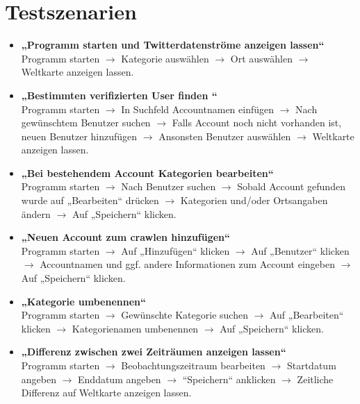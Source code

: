 \section{Testszenarien}
\begin{itemize}
	\item \textbf{„Programm starten und Twitterdatenströme anzeigen lassen“}\\
Programm starten $\rightarrow$ Kategorie auswählen $\rightarrow$ Ort auswählen $\rightarrow$ Weltkarte anzeigen lassen.

	\item \textbf{„Bestimmten verifizierten User finden “}\\
Programm starten $\rightarrow$ In Suchfeld Accountnamen einfügen $\rightarrow$ Nach gewünschtem Benutzer suchen $\rightarrow$ Falls Account noch nicht vorhanden ist, neuen Benutzer hinzufügen $\rightarrow$ Ansonsten Benutzer auswählen $\rightarrow$ Weltkarte anzeigen lassen.

	\item \textbf{„Bei bestehendem Account Kategorien bearbeiten“}\\
Programm starten $\rightarrow$ Nach Benutzer suchen $\rightarrow$ Sobald Account gefunden wurde auf „Bearbeiten“ drücken $\rightarrow$ Kategorien und/oder Ortsangaben ändern $\rightarrow$ Auf „Speichern“ klicken.

	\item \textbf{„Neuen Account zum crawlen hinzufügen“}\\
Programm starten $\rightarrow$ Auf „Hinzufügen“ klicken $\rightarrow$ Auf „Benutzer“ klicken $\rightarrow$ Accountnamen und ggf. andere Informationen zum Account eingeben $\rightarrow$ Auf „Speichern“ klicken.

	\item \textbf{„Kategorie umbenennen“}\\
Programm starten $\rightarrow$ Gewünschte Kategorie suchen $\rightarrow$ Auf „Bearbeiten“  klicken $\rightarrow$ Kategorienamen umbenennen $\rightarrow$ Auf „Speichern“ klicken.

	\item \textbf{„Differenz zwischen zwei Zeiträumen anzeigen lassen“}\\
Programm starten $\rightarrow$ Beobachtungszeitraum bearbeiten $\rightarrow$ Startdatum angeben $\rightarrow$ Enddatum angeben $\rightarrow$ “Speichern“ anklicken $\rightarrow$ Zeitliche Differenz auf Weltkarte anzeigen lassen.


\end{itemize}